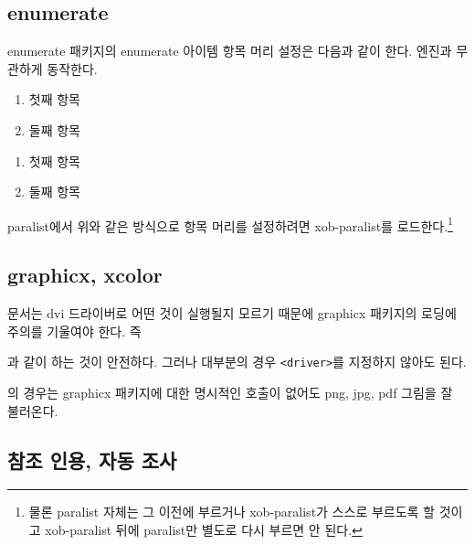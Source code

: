 \documentclass[
	12pt,
	a4paper,
	kosection,
	footnote,
	nobookmarks,
	microtype,
]{oblivoir}
\newcommand\obclass{ob\-liv\-oir\oblivoirallowbreak}
\begin{document}
\subsection{enumerate}

enumerate 패키지의 enumerate 아이템 항목 머리 설정은
다음과 같이 한다. 엔진과 무관하게 동작한다.
\begin{boxedverbatim}
\begin{enumerate}[(㉠)] \tightlist
\item 첫째 항목
\item 둘째 항목
\end{enumerate}
\end{boxedverbatim}
\begin{enumerate}[(㉠)] \tightlist
\item 첫째 항목
\item 둘째 항목
\end{enumerate}
paralist에서 위와 같은 방식으로 항목 머리를 설정하려면 
xob-paralist를 로드한다.\footnote{%
	물론 paralist 자체는 그 이전에 부르거나
	xob-paralist가 스스로 부르도록 할 것이고 xob-paralist 뒤에
	paralist만 별도로 다시 부르면 안 된다.
}

\subsection{graphicx, xcolor}

 문서는 dvi 드라이버로 어떤 것이 실행될지 모르기 때문에 graphicx 패키지의
로딩에 주의를 기울여야 한다. 즉
\begin{boxedverbatim}
\usepackage[<driver>]{graphicx}
\end{boxedverbatim}
과 같이 하는 것이 안전하다. 그러나 대부분의 경우 \verb|<driver>|를 지정하지 않아도 된다.

 \LuaTeX 의 경우는 graphicx 패키지에 대한 명시적인 호출이 없어도 
png, jpg, pdf 그림을 잘 불러온다. %

\subsection{참조 인용, 자동 조사}
\end{document}
